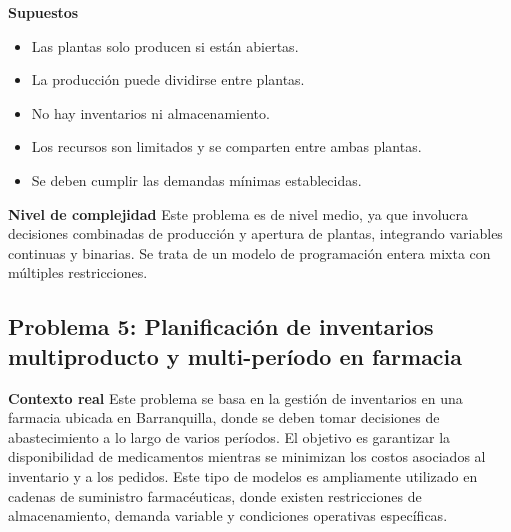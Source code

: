 \documentclass[12pt,letterpaper]{article}
\begin{document}
\textbf{Supuestos}
\begin{itemize}[leftmargin=*]
	\item Las plantas solo producen si están abiertas.
	\item La producción puede dividirse entre plantas.
	\item No hay inventarios ni almacenamiento.
	\item Los recursos son limitados y se comparten entre ambas plantas.
	\item Se deben cumplir las demandas mínimas establecidas.
\end{itemize}

\textbf{Nivel de complejidad} Este problema es de nivel medio, ya que involucra decisiones combinadas de producción y apertura de plantas, integrando variables continuas y binarias. Se trata de un modelo de programación entera mixta con múltiples restricciones.

\subsection{Problema 5: Planificación de inventarios multiproducto y multi-período en farmacia}

\textbf{Contexto real} Este problema se basa en la gestión de inventarios en una farmacia ubicada en Barranquilla, donde se deben tomar decisiones de abastecimiento a lo largo de varios períodos. El objetivo es garantizar la disponibilidad de medicamentos mientras se minimizan los costos asociados al inventario y a los pedidos. Este tipo de modelos es ampliamente utilizado en cadenas de suministro farmacéuticas, donde existen restricciones de almacenamiento, demanda variable y condiciones operativas específicas.
\end{document}
